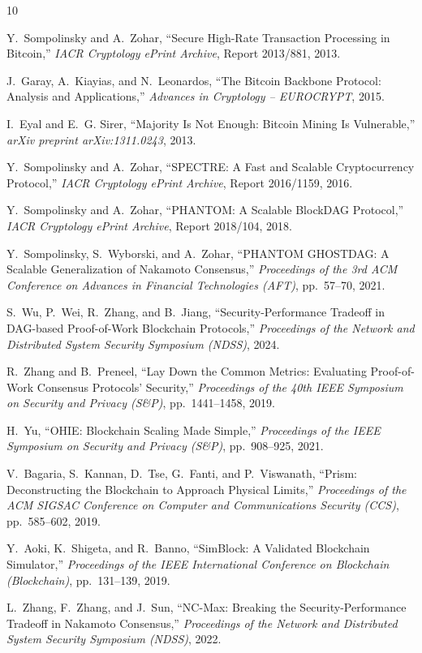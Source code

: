 \documentclass[11pt]{article}
\theoremstyle{definition}
\theoremstyle{plain}
\theoremstyle{remark}
\begin{document}
\begin{thebibliography}{10}

Y.~Sompolinsky and A.~Zohar,
``Secure High-Rate Transaction Processing in Bitcoin,''
\emph{IACR Cryptology ePrint Archive}, Report 2013/881, 2013.

J.~Garay, A.~Kiayias, and N.~Leonardos,
``The Bitcoin Backbone Protocol: Analysis and Applications,''
\emph{Advances in Cryptology -- EUROCRYPT}, 2015.

I.~Eyal and E.~G. Sirer,
``Majority Is Not Enough: Bitcoin Mining Is Vulnerable,''
\emph{arXiv preprint arXiv:1311.0243}, 2013.

Y.~Sompolinsky and A.~Zohar,
``SPECTRE: A Fast and Scalable Cryptocurrency Protocol,''
\emph{IACR Cryptology ePrint Archive}, Report 2016/1159, 2016.

Y.~Sompolinsky and A.~Zohar,
``PHANTOM: A Scalable BlockDAG Protocol,''
\emph{IACR Cryptology ePrint Archive}, Report 2018/104, 2018.

Y.~Sompolinsky, S.~Wyborski, and A.~Zohar,
``PHANTOM GHOSTDAG: A Scalable Generalization of Nakamoto Consensus,''
\emph{Proceedings of the 3rd ACM Conference on Advances in Financial
Technologies (AFT)}, pp.~57--70, 2021.

S.~Wu, P.~Wei, R.~Zhang, and B.~Jiang,
``Security-Performance Tradeoff in DAG-based Proof-of-Work Blockchain
Protocols,''
\emph{Proceedings of the Network and Distributed System Security Symposium
(NDSS)}, 2024.

R.~Zhang and B.~Preneel,
``Lay Down the Common Metrics: Evaluating Proof-of-Work Consensus Protocols'
Security,''
\emph{Proceedings of the 40th IEEE Symposium on Security and Privacy
(S\&P)}, pp.~1441--1458, 2019.

H.~Yu,
``OHIE: Blockchain Scaling Made Simple,''
\emph{Proceedings of the IEEE Symposium on Security and Privacy (S\&P)},
pp.~908--925, 2021.

V.~Bagaria, S.~Kannan, D.~Tse, G.~Fanti, and P.~Viswanath,
``Prism: Deconstructing the Blockchain to Approach Physical Limits,''
\emph{Proceedings of the ACM SIGSAC Conference on Computer and Communications
Security (CCS)}, pp.~585--602, 2019.

Y.~Aoki, K.~Shigeta, and R.~Banno,
``SimBlock: A Validated Blockchain Simulator,''
\emph{Proceedings of the IEEE International Conference on Blockchain
(Blockchain)}, pp.~131--139, 2019.

L.~Zhang, F.~Zhang, and J.~Sun,
``NC-Max: Breaking the Security-Performance Tradeoff in Nakamoto Consensus,''
\emph{Proceedings of the Network and Distributed System Security Symposium
(NDSS)}, 2022.

\end{thebibliography}
\end{document}
